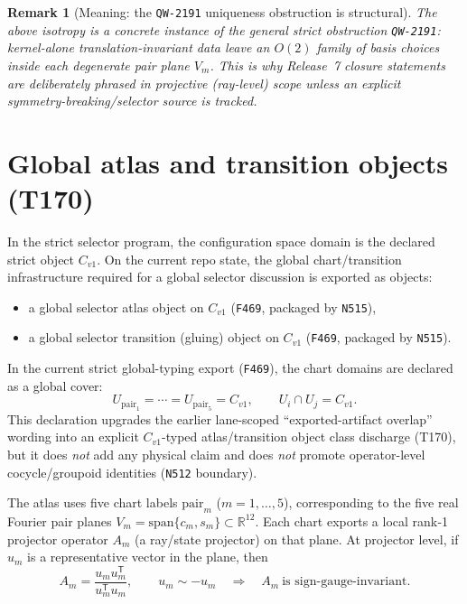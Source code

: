\documentclass[11pt,a4paper]{article}
\newtheorem{remark}{Remark}[section]
\begin{document}
\begin{remark}[Meaning: the \texttt{QW-2191} uniqueness obstruction is structural]
The above isotropy is a concrete instance of the general strict obstruction \texttt{QW-2191}:
kernel-alone translation-invariant data leave an $O(2)$ family of basis choices inside each degenerate pair plane $V_m$.
This is why Release~7 closure statements are deliberately phrased in \emph{projective (ray-level)} scope unless an explicit symmetry-breaking/selector source is tracked.
\end{remark}
\section{Global atlas and transition objects (T170)}

In the strict selector program, the configuration space domain is the declared strict object $C_{v1}$.
On the current repo state, the global chart/transition infrastructure required for a global selector discussion is exported as objects:

\begin{itemize}
  \item a global selector atlas object on $C_{v1}$ (\texttt{F469}, packaged by \texttt{N515}),
  \item a global selector transition (gluing) object on $C_{v1}$ (\texttt{F469}, packaged by \texttt{N515}).
\end{itemize}

In the current strict global-typing export (\texttt{F469}), the chart domains are declared as a global cover:
\[
U_{\mathrm{pair}_1}=\cdots=U_{\mathrm{pair}_5}=C_{v1},
\qquad
U_i\cap U_j=C_{v1}.
\]
This declaration upgrades the earlier lane-scoped “exported-artifact overlap” wording into an explicit $C_{v1}$-typed atlas/transition object class discharge (T170),
but it does \emph{not} add any physical claim and does \emph{not} promote operator-level cocycle/groupoid identities (\texttt{N512} boundary).

The atlas uses five chart labels $\mathrm{pair}_m$ ($m=1,\dots,5$), corresponding to the five real Fourier pair planes
$V_m=\mathrm{span}\{c_m,s_m\}\subset \mathbb{R}^{12}$.
Each chart exports a local rank‑1 projector operator $A_m$ (a ray/state projector) on that plane.
At projector level, if $u_m$ is a representative vector in the plane, then
\[
A_m=\frac{u_m u_m^{\mathsf T}}{u_m^{\mathsf T}u_m},
\qquad
u_m\sim -u_m\quad\Rightarrow\quad A_m\ \text{is sign-gauge-invariant.}
\]
\end{document}

